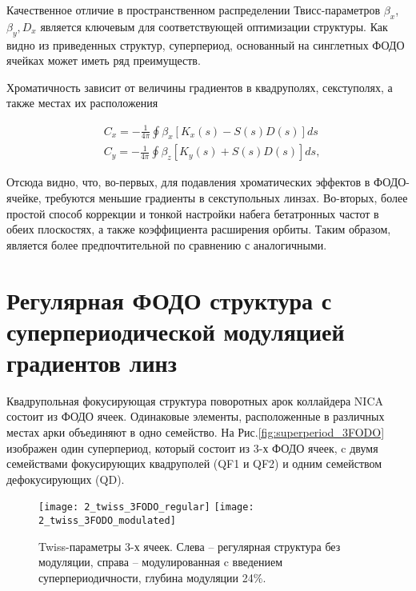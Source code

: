 \par Качественное отличие в пространственном распределении Твисс-параметров $\beta_{x}$, $\beta_{y}, D_{x}$ является ключевым для соответствующей оптимизации структуры.
Как видно из приведенных структур, суперпериод, основанный на синглетных ФОДО ячейках может иметь ряд преимуществ.

\noindent Хроматичность зависит от величины градиентов в квадруполях, секступолях, а также местах их расположения \cite{lee}

\begin{equation}
\begin{aligned}
& C_x=-\frac{1}{4 \pi} \oint \beta_x\left[K_x(s)-S(s) D(s)\right] d s \\
& C_y=-\frac{1}{4 \pi} \oint \beta_z\left[K_y(s)+S(s) D(s)\right] d s,
\end{aligned}
\end{equation}

\noindent Отсюда видно, что, во-первых, для подавления хроматических эффектов в ФОДО-ячейке, требуются меньшие градиенты в секступольных линзах. Во-вторых, более простой способ коррекции и тонкой настройки набега бетатронных частот в обеих плоскостях, а также коэффициента расширения орбиты. Таким образом, является более предпочтительной по сравнению с аналогичными.

	\section{Регулярная ФОДО структура с суперпериодической модуляцией градиентов линз}\label{sec:transition_variation/methods/FODO}

\par Квадрупольная фокусирующая структура поворотных арок коллайдера NICA состоит из ФОДО ячеек. Одинаковые элементы, расположенные в различных местах арки объединяют в одно семейство. На Рис.\ref{fig:superperiod_3FODO} изображен один суперпериод, который состоит из 3-х ФОДО ячеек, c двумя семействами фокусирующих квадруполей (QF1 и QF2) и одним семейством дефокусирующих (QD).

\begin{figure}
   \texttt{[image: 2\_twiss\_3FODO\_regular]}
   \texttt{[image: 2\_twiss\_3FODO\_modulated]}
   \caption{Twiss-параметры 3-х ячеек. Слева – регулярная структура без модуляции, справа – модулированная c введением суперпериодичности, глубина модуляции 24\%.}
   \label{fig:twiss_3FODO}
\end{figure}

